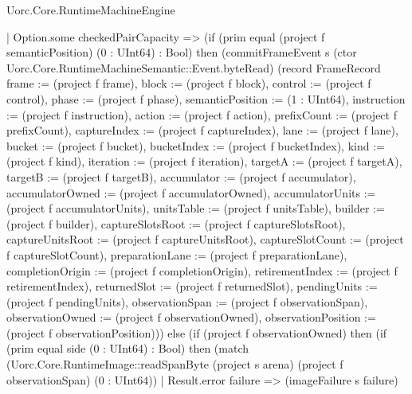 \begin{lexlean}{Uorc.Core.RuntimeMachineEngine}
\begin{semanticmodule}
{      | Option.some checkedPairCapacity => (if (prim equal (project f semanticPosition) (0 : UInt64) : Bool) then (commitFrameEvent s (ctor Uorc.Core.RuntimeMachineSemantic::Event.byteRead) (record FrameRecord {frame := (project f frame), block := (project f block), control := (project f control), phase := (project f phase), semanticPosition := (1 : UInt64), instruction := (project f instruction), action := (project f action), prefixCount := (project f prefixCount), captureIndex := (project f captureIndex), lane := (project f lane), bucket := (project f bucket), bucketIndex := (project f bucketIndex), kind := (project f kind), iteration := (project f iteration), targetA := (project f targetA), targetB := (project f targetB), accumulator := (project f accumulator), accumulatorOwned := (project f accumulatorOwned), accumulatorUnits := (project f accumulatorUnits), unitsTable := (project f unitsTable), builder := (project f builder), captureSlotsRoot := (project f captureSlotsRoot), captureUnitsRoot := (project f captureUnitsRoot), captureSlotCount := (project f captureSlotCount), preparationLane := (project f preparationLane), completionOrigin := (project f completionOrigin), retirementIndex := (project f retirementIndex), returnedSlot := (project f returnedSlot), pendingUnits := (project f pendingUnits), observationSpan := (project f observationSpan), observationOwned := (project f observationOwned), observationPosition := (project f observationPosition)})) else (if (project f observationOwned) then (if (prim equal side (0 : UInt64) : Bool) then (match (Uorc.Core.RuntimeImage::readSpanByte (project s arena) (project f observationSpan) (0 : UInt64))
        | Result.error failure => (imageFailure s failure)
}
\end{semanticmodule}
\end{lexlean}
